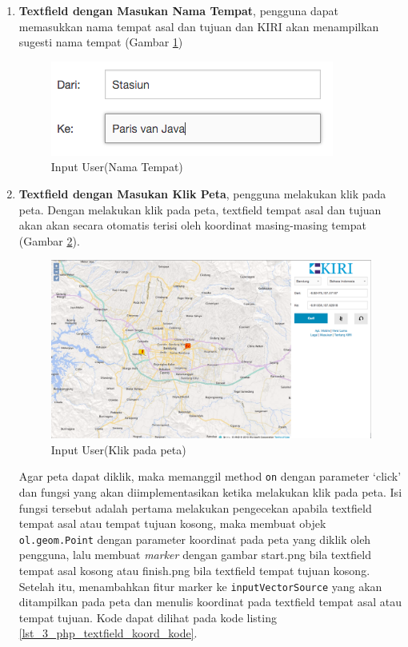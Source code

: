 \begin{enumerate}
	\item \textbf{Textfield dengan Masukan Nama Tempat}, pengguna dapat memasukkan nama tempat asal dan tujuan dan KIRI akan menampilkan sugesti nama tempat (Gambar \ref{fig:3_KIRI_textfield_nama})
	
	\begin{figure}[H]
		\centering
		\includegraphics[scale=0.5]{Gambar/KIRI-textfield-nama}
		\caption{Input User(Nama Tempat)} 
		\label{fig:3_KIRI_textfield_nama}
	\end{figure}
	
	\item \textbf{Textfield dengan Masukan Klik Peta}, pengguna melakukan klik pada peta. Dengan melakukan klik pada peta, textfield tempat asal dan tujuan akan akan secara otomatis terisi oleh koordinat masing-masing tempat (Gambar \ref{fig:3_KIRI_textfield_koord}).
	
\begin{figure}[H]
	\centering
	\includegraphics[scale=0.3]{Gambar/KIRI-textfield-koord}
	\caption{Input User(Klik pada peta)} 
	\label{fig:3_KIRI_textfield_koord}
\end{figure}
	
	Agar peta dapat diklik, maka memanggil method \verb!on! dengan parameter `click' dan fungsi yang akan diimplementasikan ketika melakukan klik pada peta. Isi fungsi tersebut adalah pertama melakukan pengecekan apabila textfield tempat asal atau tempat tujuan kosong, maka membuat objek \verb!ol.geom.Point! dengan parameter koordinat pada peta yang diklik oleh pengguna, lalu membuat \textit{marker} dengan gambar start.png bila textfield tempat asal kosong atau finish.png bila textfield tempat tujuan kosong. Setelah itu, menambahkan fitur marker ke \verb!inputVectorSource! yang akan ditampilkan pada peta dan menulis koordinat pada textfield tempat asal atau tempat tujuan. Kode dapat dilihat pada kode listing \ref{lst_3_php_textfield_koord_kode}.
	

\end{enumerate}
